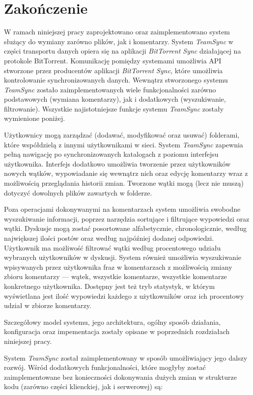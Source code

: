 
\chapter{Zakończenie}

W ramach niniejszej pracy zaprojektowano oraz zaimplementowano system służący do wymiany zarówno plików, jak i komentarzy. System \emph{TeamSync} w części transportu danych opiera się na aplikacji \emph{BitTorrent Sync} działającej na protokole BitTorrent. Komunikację pomiędzy systemami umożliwia API stworzone przez producentów aplikacji \emph{BitTorrent Sync}, które umożliwia kontrolowanie synchronizowanych danych. Wewnątrz stworzonego systemu \emph{TeamSync} zostało zaimplementowanych wiele funkcjonalności zarówno podstawowych (wymiana komentarzy), jak i dodatkowych (wyszukiwanie, filtrowanie). Wszystkie najistotniejsze funkcje systemu \emph{TeamSync} zostały wymienione poniżej.

Użytkownicy mogą zarządzać (dodawać, modyfikować oraz usuwać) folderami, które współdzielą z innymi użytkownikami w sieci. System \emph{TeamSync} zapewnia pełną nawigację po synchronizowanych katalogach z poziomu interfejsu użytkownika. Interfejs dodatkowo umożliwia tworzenie przez użytkowników nowych wątków, wypowiadanie się wewnątrz nich oraz edycję komentarzy wraz z możliwością przeglądania historii zmian. Tworzone wątki mogą (lecz nie muszą) dotyczyć dowolnych plików zawartych w folderze.

Poza operacjami dokonywanymi na komentarzach system umożliwia swobodne wyszukiwanie informacji, poprzez narzędzia sortujące i filtrujące wypowiedzi oraz wątki. Dyskusje mogą zostać posortowane alfabetycznie, chronologicznie, według największej ilości postów oraz według najpóźniej dodanej odpowiedzi. Użytkownik ma możliwość filtrować wątki według procentowego udziału wybranych użytkowników w dyskusji. System również umożliwia wyszukiwanie wpisywanych przez użytkownika fraz w komentarzach z możliwością zmiany zbioru komentarzy --- wątek, wszystkie komentarze, wszystkie komentarze konkretnego użytkownika. Dostępny jest też tryb statystyk, w którym wyświetlana jest ilość wypowiedzi każdego z użytkowników oraz ich procentowy udział w zbiorze komentarzy.

Szczegółowy model systemu, jego architektura, ogólny sposób działania, konfiguracja oraz impementacja zostały opisane w poprzednich rozdziałach niniejszej pracy. 

System \emph{TeamSync} został zaimplementowany w sposób umożliwiający jego dalszy rozwój. Wśród dodatkowych funkcjonalności, które mogłyby zostać zaimplementowane bez konieczności dokonywania dużych zmian w strukturze kodu (zarówno części klienckiej, jak i serwerowej) są:

